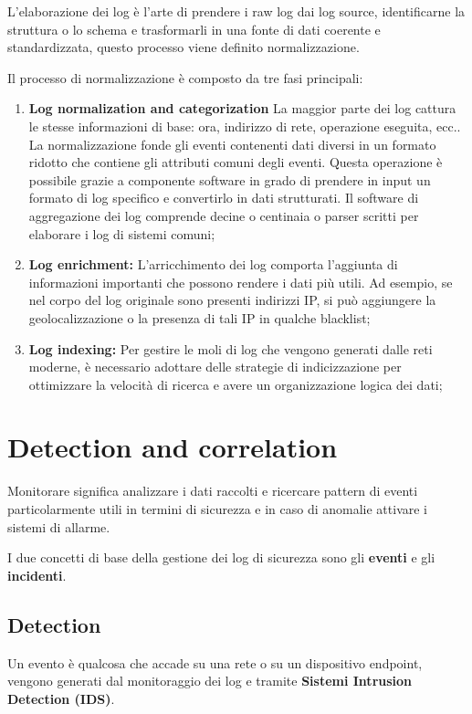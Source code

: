 L'elaborazione dei log è l'arte di prendere i raw log dai log source, identificarne la struttura o lo schema e trasformarli in una fonte di dati coerente e standardizzata, questo processo viene definito normalizzazione.\par
Il processo di normalizzazione è composto da tre fasi principali:


\begin{enumerate}
    \item\textbf{Log normalization and categorization} La maggior parte dei log cattura le stesse informazioni di base: ora, indirizzo di rete, operazione eseguita, ecc..
    La normalizzazione fonde gli eventi contenenti dati diversi in un formato ridotto che contiene gli attributi comuni degli eventi.
    Questa operazione è possibile grazie a componente software in grado di prendere in input un formato di log specifico e convertirlo in dati strutturati.
    Il software di aggregazione dei log comprende decine o centinaia o parser scritti per elaborare i log di sistemi comuni;
    \item\textbf{Log enrichment:} L'arricchimento dei log comporta l'aggiunta di informazioni importanti che possono rendere i dati più utili. Ad esempio, se nel corpo del log originale sono presenti indirizzi IP, si può aggiungere la geolocalizzazione o la presenza di tali IP in qualche blacklist;
    \item\textbf{Log indexing:} Per gestire le moli di log che vengono generati dalle reti moderne,  è necessario adottare delle strategie di indicizzazione per ottimizzare la velocità di ricerca e avere un organizzazione logica dei dati;
\end{enumerate}

\section{Detection and correlation }
\label{sec:Detection and correlation }

Monitorare significa analizzare i dati raccolti e ricercare pattern di eventi particolarmente utili in termini di sicurezza e in caso di anomalie attivare i sistemi di allarme.\par

I due concetti di base della gestione dei log di sicurezza sono gli \textbf{eventi} e gli \textbf{incidenti}.
\newpage

\subsection{Detection}
Un evento è qualcosa che accade su una rete o su un dispositivo endpoint, vengono generati dal monitoraggio dei log e tramite \textbf{Sistemi Intrusion Detection (IDS)}.

